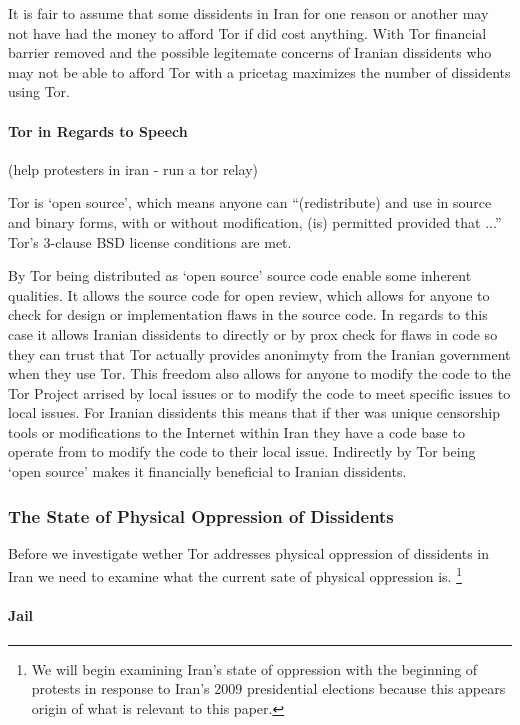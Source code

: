 \documentclass[11pt]{article}
\begin{document}
\begin{multicols}{2}
It is fair to assume that some dissidents in Iran for one reason or another may
not have had the money to afford Tor if did cost anything. With Tor financial
barrier removed and the possible legitemate concerns of Iranian dissidents who
may not be able to afford Tor with a pricetag maximizes the number of dissidents
using Tor.

\paragraph{Tor in Regards to Speech}
(help protesters in iran - run a tor relay)

Tor is `open source', which means anyone can ``(redistribute) and use in source and
binary forms, with or without modification, (is) permitted provided that ...'' 
Tor's 3-clause BSD license conditions are met. \cite{BSD:3-ClauseLicense,
TOR:Download, TOR:BSD-License} 

By Tor being distributed as `open source' source code enable some inherent
qualities. It allows the source code for open review, which allows for anyone to
check for design or implementation flaws in the source code. In regards to this
case it allows Iranian dissidents to directly or by prox check for flaws in code
so they can trust that Tor actually provides anonimyty from the Iranian
government when they use Tor. This freedom also allows for anyone to modify the
code to the Tor Project arrised by local issues or to modify the code to meet
specific issues to local issues. For Iranian dissidents this means that if ther
was unique censorship tools or modifications to the Internet within Iran they
have a code base to operate from to modify the code to their local issue.
Indirectly by Tor being `open source' makes it financially beneficial to Iranian
dissidents.

\subsubsection{The State of Physical Oppression of Dissidents}
Before we investigate wether Tor addresses physical oppression of dissidents in
Iran we need to examine what the current sate of physical oppression is.
\footnote{We will begin examining Iran's state of oppression with the beginning
of protests in response to Iran's 2009 presidential elections because this
appears origin of what is relevant to this paper.}

\paragraph{Jail}


\end{multicols}
\end{document}
